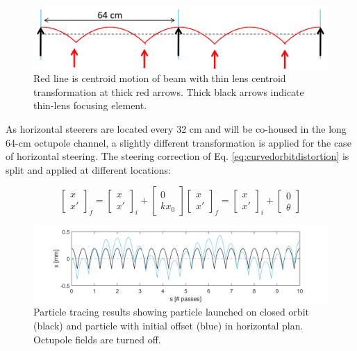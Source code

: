 \begin{figure}
\centering
\includegraphics[width=\textwidth]{7.figures/steeringtolerance/horz_bg_field_distortion_cartoon.png}
\caption{Red line is centroid motion of beam with thin lens centroid transformation at thick red arrows. Thick black arrows indicate thin-lens focusing element.}
\label{fig:horzcurvedorbitdistortion}
\end{figure}

As horizontal steerers are located every 32 cm and will be co-housed in the long 64-cm octupole channel, a slightly different transformation is applied for the case of horizontal steering. The steering correction of Eq. \ref{eq:curvedorbitdistortion} is split and applied at different locations: 

\begin{subequations}
\begin{equation}
\begin{bmatrix} x \\ x' \end{bmatrix}_f = \begin{bmatrix} x \\ x' \end{bmatrix}_i + \begin{bmatrix} 0 \\ kx_0 \end{bmatrix}
\label{eq:horzcurvedorbitdistortion1}
\end{equation}
\begin{equation}
\begin{bmatrix} x \\ x' \end{bmatrix}_f = \begin{bmatrix} x \\ x' \end{bmatrix}_i + \begin{bmatrix} 0 \\ \theta \end{bmatrix}
\label{eq:horzcurvedorbitdistortion2}
\end{equation}
\end{subequations}

\begin{figure}
\centering
\includegraphics[width=\textwidth]{7.figures/steeringtolerance/sp_traces.png}
\caption{Particle tracing results showing particle launched on closed orbit (black) and particle with initial offset (blue) in horizontal plan. Octupole fields are turned off.}
\label{fig:horsptraces}
\end{figure}

